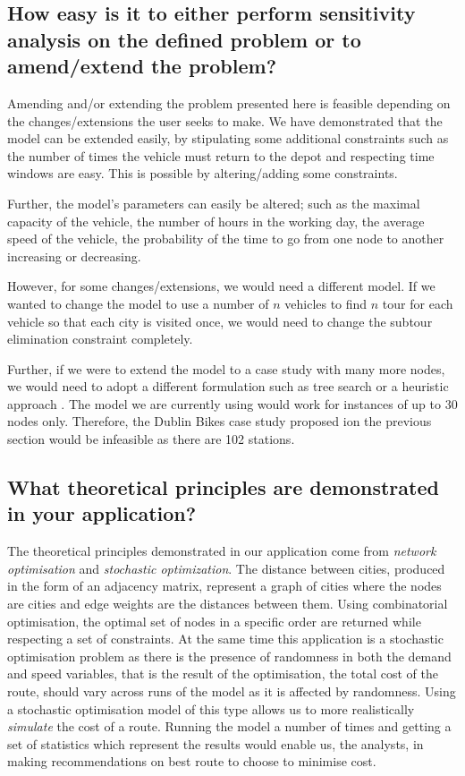 \documentclass[a4paper,11pt]{article}
\begin{document}
\subsection{How easy is it to either perform sensitivity analysis on the defined problem or to
amend/extend the problem? }

Amending and/or extending the problem presented here is feasible depending on the changes/extensions the user seeks to make. We have demonstrated that the model can be extended easily, by stipulating some additional constraints such as the number of times the vehicle must return to the depot and respecting time windows are easy. This is possible by altering/adding some constraints. 

Further, the model's parameters can easily be altered; such as the maximal capacity of the vehicle, the number of hours in the working day, the average speed of the vehicle, the probability of the time to go from one node to another increasing or decreasing.

However, for some changes/extensions, we would need a different model. If we wanted to change the model to use a number of $n$ vehicles to find $n$ tour for each vehicle so that each city is visited once, we would need to change the subtour elimination constraint completely. 

Further, if we were to extend the model to a case study with many more nodes, we would need to adopt a different formulation such as tree search or a heuristic approach \cite{gueret1999applications}. The model we are currently using would work for instances of up to 30 nodes only. Therefore, the Dublin Bikes case study proposed ion the previous section would be infeasible as there are 102 stations.



\subsection{What theoretical principles are demonstrated in your application?}

The theoretical principles demonstrated in our application come from \textit{network optimisation} and \textit{stochastic optimization}. The distance between cities, produced in the form of an adjacency matrix, represent a graph of cities where the nodes are cities and edge weights are the distances between them. Using combinatorial optimisation, the optimal set of nodes in a specific order are returned while respecting a set of constraints. At the same time this application is a stochastic optimisation problem as there is the presence of randomness in both the demand and speed variables, that is the result of the optimisation, the total cost of the route, should vary across runs of the model as it is affected by randomness. Using a stochastic optimisation model of this type allows us to more realistically \textit{simulate} the cost of a route. Running the model a number of times and getting a set of statistics which represent the results would enable us, the analysts, in making recommendations on best route to choose to minimise cost.
\end{document}

